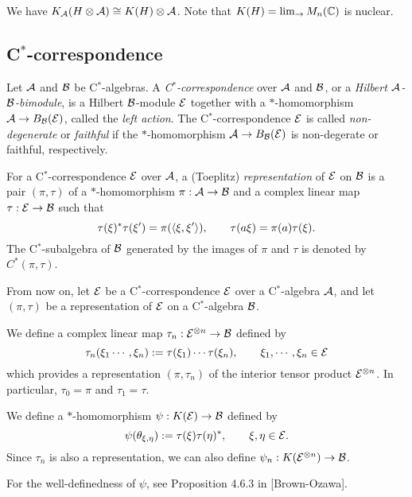 \documentclass{../../small}
\begin{document}
We have $K_{\mathcal{A}}(H\otimes\mathcal{A})\cong K(H)\otimes\mathcal{A}$. Note that $K(H)=\lim_\to M_n(\mathbb{C})$ is nuclear.





\subsection{C$^*$-correspondence}



\begin{defn}[C$^*$-correspondences]
Let $\mathcal{A}$ and $\mathcal{B}$ be C$^*$-algebras.
A \emph{C$^*$-correspondence} over $\mathcal{A}$ and $\mathcal{B}$, or a \emph{Hilbert $\mathcal{A}$-$\mathcal{B}$-bimodule}, is a Hilbert $\mathcal{B}$-module $\mathcal{E}$ together with a $*$-homomorphism $\mathcal{A}\to B_{\mathcal{B}}(\mathcal{E})$, called the \emph{left action}.
The C$^*$-correspondence $\mathcal{E}$ is called \emph{non-degenerate} or \emph{faithful} if the $*$-homomorphism $\mathcal{A}\to B_{\mathcal{B}}(\mathcal{E})$ is non-degerate or faithful, respectively.
\end{defn}


\begin{defn}
For a C$^*$-correspondence $\mathcal{E}$ over $\mathcal{A}$, a (Toeplitz) \emph{representation} of $\mathcal{E}$ on $\mathcal{B}$ is a pair $(\pi,\tau)$ of a $*$-homomorphism $\pi:\mathcal{A}\to\mathcal{B}$ and a complex linear map $\tau:\mathcal{E}\to\mathcal{B}$ such that
\[\tau(\xi)^*\tau(\xi')=\pi(\langle\xi,\xi'\rangle),\qquad\tau(a\xi)=\pi(a)\tau(\xi).\]
The C$^*$-subalgebra of $\mathcal{B}$ generated by the images of $\pi$ and $\tau$ is denoted by $C^*(\pi,\tau)$.
\end{defn}

From now on, let $\mathcal{E}$ be a C$^*$-correspondence $\mathcal{E}$ over a C$^*$-algebra $\mathcal{A}$, and let $(\pi,\tau)$ be a representation of $\mathcal{E}$ on a C$^*$-algebra $\mathcal{B}$.

\begin{defn}
We define a complex linear map $\tau_n:\mathcal{E}^{\otimes n}\to\mathcal{B}$ defined by
\[\tau_n(\xi_1\cdots,\xi_n):=\tau(\xi_1)\cdots\tau(\xi_n),\qquad\xi_1,\cdots,\xi_n\in\mathcal{E}\]
which provides a representation $(\pi,\tau_n)$ of the interior tensor product $\mathcal{E}^{\otimes n}$.
In particular, $\tau_0=\pi$ and $\tau_1=\tau$.
\end{defn}

\begin{defn}
We define a $*$-homomorphism $\psi:K(\mathcal{E})\to\mathcal{B}$ defined by
\[\psi(\theta_{\xi,\eta}):=\tau(\xi)\tau(\eta)^*,\qquad\xi,\eta\in\mathcal{E}.\]
Since $\tau_n$ is also a representation, we can also define $\psi_n:K(\mathcal{E}^{\otimes n})\to\mathcal{B}$.
\end{defn}
\begin{rmk}
For the well-definedness of $\psi$, see Proposition 4.6.3 in [Brown-Ozawa].
\end{rmk}
\end{document}
